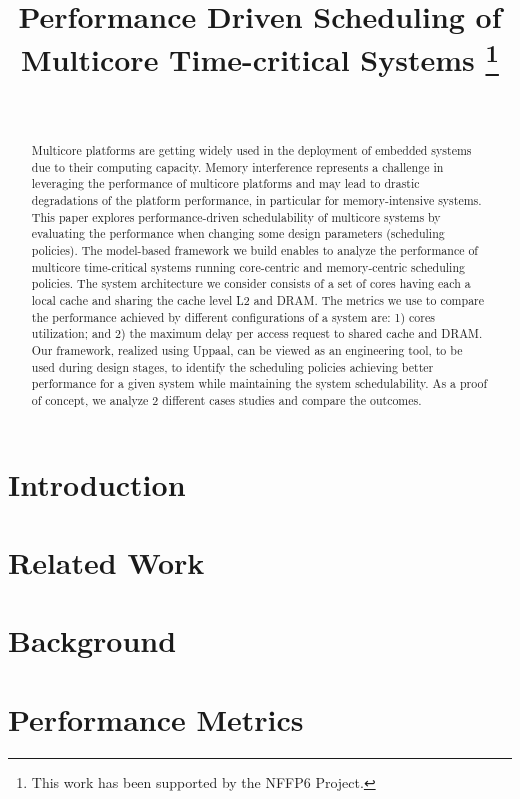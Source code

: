 \documentclass{IEEEtran}
\title{Performance Driven Scheduling of Multicore Time-critical Systems \thanks{This work has been supported by the NFFP6 Project.}}
\author{
\IEEEauthorblockN{Jalil Boudjadar, Jin Hyun Kim, Simin Nadjm-Tehrani} \\
\IEEEauthorblockA{Department of Computer and Information Science \\ Link\"oping University, Sweden} 
}
\begin{document}
\maketitle


\begin{abstract}
Multicore platforms are getting widely used in the deployment of embedded systems due to their computing capacity. Memory interference represents a challenge in leveraging the performance of multicore platforms and may lead to drastic degradations of the platform performance, in particular for memory-intensive systems. This paper explores performance-driven schedulability of  multicore systems by evaluating the performance when changing some design parameters (scheduling policies). The model-based framework we build enables to analyze the performance of multicore time-critical systems running core-centric and memory-centric scheduling policies. The system architecture we consider consists of a set of cores having each a local cache and sharing the cache level L2 and DRAM. The metrics we use to compare the performance achieved by different configurations of a system are: 1) cores utilization; and 2) the maximum delay per access request to shared cache and DRAM. Our framework, realized using Uppaal, can be viewed as an engineering tool, to be used during design stages, to identify the scheduling policies achieving  better performance for a given system while maintaining the system schedulability. As a proof of concept, we analyze 2 different cases studies and compare the outcomes.
\end{abstract}



\section{Introduction}


\section{Related Work}



\section{Background}


\section{Performance Metrics}

\end{document}
